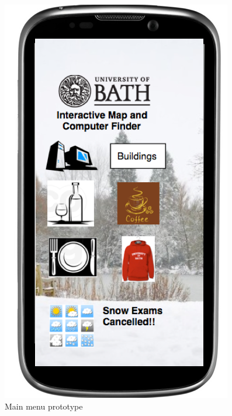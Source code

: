 \documentclass[10pt,a4paper,oneside]{report}
\begin{document}
\begin{figure}[H]
 \caption{Main menu prototype}
 \centering
 \includegraphics[keepaspectratio, scale=0.4]{prototype.png}
\end{figure}
\end{document}

